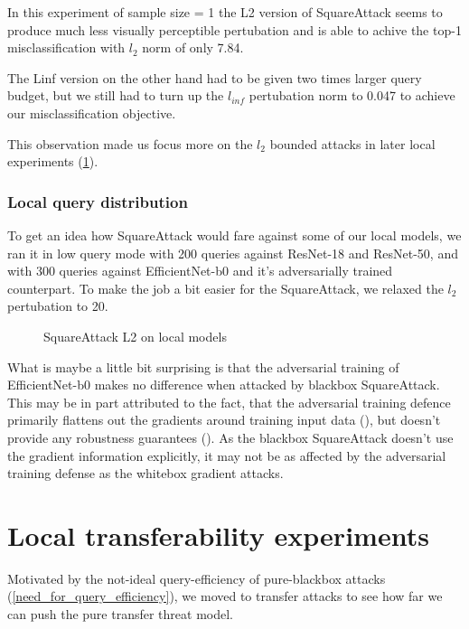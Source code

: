 In this experiment of sample size = 1 the L2 version of SquareAttack seems to produce much less visually perceptible pertubation and is able to achive the top-1 misclassification with $l_2$ norm of only 7.84.

The Linf version on the other hand had to be given two times larger query budget, but we still had to turn up the $l_{inf}$ pertubation norm to 0.047 to achieve our misclassification objective.


This observation made us focus more on the $l_2$ bounded attacks in later local experiments (\ref{local_transfer}).

\subsubsection{Local query distribution}
To get an idea how SquareAttack would fare against some of our local models, we ran it in low query mode with 200 queries against ResNet-18 and ResNet-50, and with 300 queries against EfficientNet-b0 and it's adversarially trained counterpart. To make the job a bit easier for the SquareAttack, we relaxed the $l_2$ pertubation to 20.

\begin{figure}[!htb]
 \hfill
 \hfill
\caption{SquareAttack L2 on local models}
\end{figure}

What is maybe a little bit surprising is that the adversarial training of EfficientNet-b0 makes no difference when attacked by blackbox SquareAttack. This may be in part attributed to the fact, that the adversarial training defence primarily flattens out the gradients around training input data (\cite{Yu2018TowardsRT}), but doesn't provide any robustness guarantees (\cite{Kolter2018ProvableDA}). As the blackbox SquareAttack doesn't use the gradient information explicitly, it may not be as affected by the adversarial training defense as the whitebox gradient attacks.


\section{Local transferability experiments}
\label{local_transfer}
Motivated by the not-ideal query-efficiency of pure-blackbox attacks (\ref{need_for_query_efficiency}), we moved to transfer attacks to see how far we can push the pure transfer threat model.


